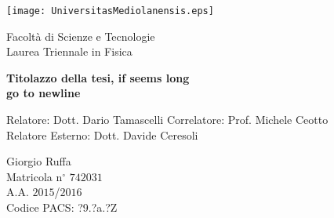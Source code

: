 {
\thispagestyle{empty}

\centerline{
\texttt{[image: UniversitasMediolanensis.eps]}
}

\begin{center}
{\Large Facolt\`a di Scienze e Tecnologie\\
\vskip0.2cm Laurea Triennale in Fisica }
\end{center}


\vskip1.5cm
\begin{center}
{\huge \textbf{Titolazzo della tesi, if seems long\\go to newline}}
\end{center}

{\large
\vskip20mm Relatore:  Dott. Dario Tamascelli
\vskip 1mm Correlatore: Prof. Michele Ceotto\\
\vskip 1mm Relatore Esterno: Dott. Davide Ceresoli\\
}

\vskip2cm
\hskip9cm\parbox[t]{7cm}
{\large 
Giorgio Ruffa\\
Matricola n$^\circ$ $742031$\\
A.A. $2015$/$2016$\\
\vskip 0.5mm Codice PACS: ?9.?a.?Z
}

\newpage
\newpage
\thispagestyle{empty}
\clearpage
}

